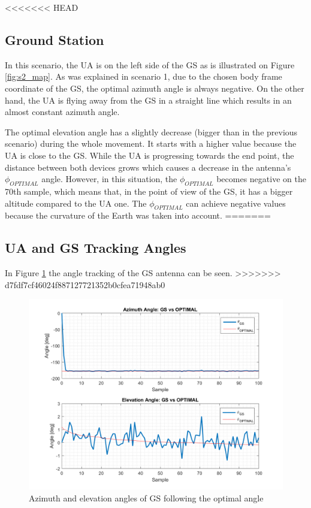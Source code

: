 <<<<<<< HEAD
\subsection{Ground Station}
In this scenario, the UA is on the left side of the GS as is illustrated on Figure \ref{fig:s2_map}. As was explained in scenario 1, due to the chosen body frame coordinate of the GS, the optimal azimuth angle is always negative. On the other hand, the UA is flying away from the GS in a straight line which results in an almost constant azimuth angle. 

The optimal elevation angle has a slightly decrease (bigger than in the previous scenario) during the whole movement. It starts with a higher value because the UA is close to the GS. While the UA is progressing towards the end point, the distance between both devices grows which causes a decrease in the antenna's $\phi_{OPTIMAL}$ angle. However, in this situation, the $\phi_{OPTIMAL}$ becomes negative on the 70th sample, which means that, in the point of view of the GS, it has a bigger altitude compared to the UA one. The $\phi_{OPTIMAL}$ can achieve negative values because the curvature of the Earth was taken into account.
=======
\subsection*{UA and GS Tracking Angles}
In Figure \ref{fig:s2_gs} the angle tracking of the GS antenna can be seen.
>>>>>>> d7fdf7cf46024f887127721352b0cfea71948ab0

\begin{figure}[H]
	\centering
	\includegraphics[scale=0.8]{figures/s2_gs.png}
	\caption{Azimuth and elevation angles of GS following the optimal angle}
	\label{fig:s2_gs}
\end{figure}

